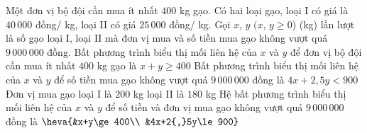 \begin{ex}%
	Một đơn vị bộ đội cần mua ít nhất $400$ kg gạo. Có hai loại  gạo, loại I có giá là $40\,000$ đồng/ kg, loại II có giá $25\,000$ đồng/ kg. Gọi $x$, $y$ $(x$, $y\ge 0$) (kg) lần lượt là số gạo loại I, loại II mà đơn vị mua và số tiền mua gạo không vượt quá $9\,000\,000$ đồng.
	 \choiceTF
		{\True Bất phương trình biểu thị mối liên hệ của $x$ và $y$ để đơn vị bộ  đội cần mua ít nhất $400$ kg gạo là $x+y\ge 400$}
		{Bất phương trình biểu thị mối liên hệ của $x$  và $y$ để số tiền mua gạo không vượt quá $9\,000\,000$ đồng là $4x+2{,}5y<900$}
		{Đơn vị mua gạo loại I là $200$ kg  loại II là $180$ kg}
		{\True Hệ bất phương trình biểu thị mối liên hệ của $x$ và $y$ để số tiền và đơn vị mua gạo không vượt quá $9\,000\,000$ đồng là $\heva{&x+y\ge 400\\ &4x+2{,}5y\le 900}$} 
\end{ex}

